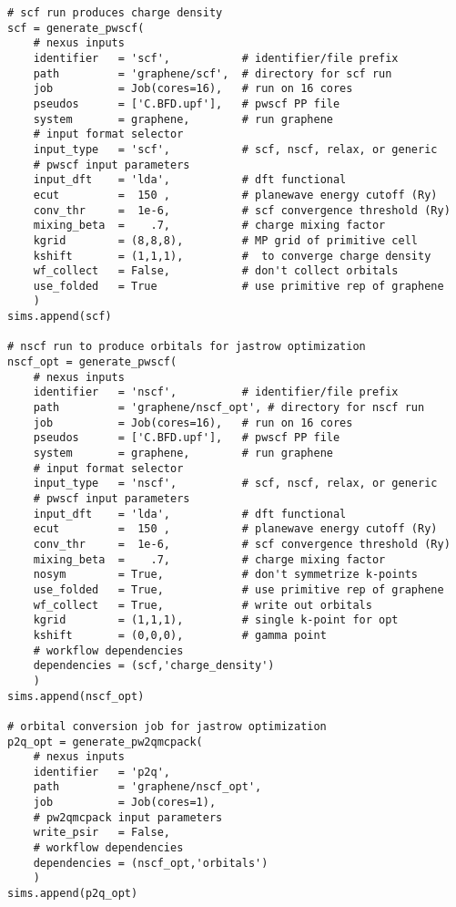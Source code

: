 \documentclass[oneside,11pt]{memoir}
\numberwithin{equation}{section}
\begin{document}
\begin{verbatim}
# scf run produces charge density
scf = generate_pwscf(
    # nexus inputs
    identifier   = 'scf',           # identifier/file prefix
    path         = 'graphene/scf',  # directory for scf run
    job          = Job(cores=16),   # run on 16 cores
    pseudos      = ['C.BFD.upf'],   # pwscf PP file
    system       = graphene,        # run graphene
    # input format selector
    input_type   = 'scf',           # scf, nscf, relax, or generic
    # pwscf input parameters
    input_dft    = 'lda',           # dft functional
    ecut         =  150 ,           # planewave energy cutoff (Ry)
    conv_thr     =  1e-6,           # scf convergence threshold (Ry)
    mixing_beta  =    .7,           # charge mixing factor
    kgrid        = (8,8,8),         # MP grid of primitive cell
    kshift       = (1,1,1),         #  to converge charge density
    wf_collect   = False,           # don't collect orbitals
    use_folded   = True             # use primitive rep of graphene
    )
sims.append(scf)  

# nscf run to produce orbitals for jastrow optimization
nscf_opt = generate_pwscf(
    # nexus inputs
    identifier   = 'nscf',          # identifier/file prefix      
    path         = 'graphene/nscf_opt', # directory for nscf run       
    job          = Job(cores=16),   # run on 16 cores             
    pseudos      = ['C.BFD.upf'],   # pwscf PP file               
    system       = graphene,        # run graphene                
    # input format selector                                      
    input_type   = 'nscf',          # scf, nscf, relax, or generic
    # pwscf input parameters
    input_dft    = 'lda',           # dft functional
    ecut         =  150 ,           # planewave energy cutoff (Ry)
    conv_thr     =  1e-6,           # scf convergence threshold (Ry)
    mixing_beta  =    .7,           # charge mixing factor
    nosym        = True,            # don't symmetrize k-points
    use_folded   = True,            # use primitive rep of graphene
    wf_collect   = True,            # write out orbitals
    kgrid        = (1,1,1),         # single k-point for opt
    kshift       = (0,0,0),         # gamma point
    # workflow dependencies
    dependencies = (scf,'charge_density')
    )
sims.append(nscf_opt)

# orbital conversion job for jastrow optimization
p2q_opt = generate_pw2qmcpack(
    # nexus inputs
    identifier   = 'p2q',
    path         = 'graphene/nscf_opt',
    job          = Job(cores=1),
    # pw2qmcpack input parameters
    write_psir   = False,
    # workflow dependencies
    dependencies = (nscf_opt,'orbitals')
    )
sims.append(p2q_opt)


\end{verbatim}
\end{document}
